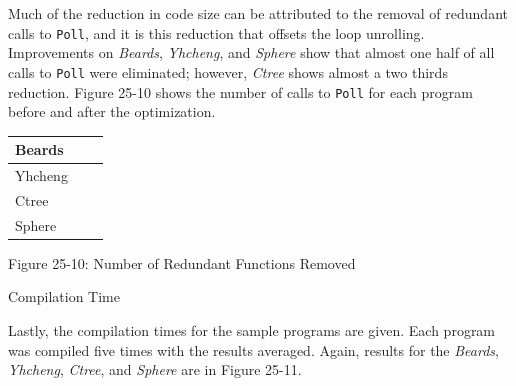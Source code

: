 Much of the reduction in code size can be attributed to the removal of
redundant calls to \texttt{Poll}, and it is this reduction that
offsets the loop unrolling. Improvements on \textit{Beards},
\textit{Yhcheng}, and \textit{Sphere} show that almost one half of all
calls to \texttt{Poll} were eliminated; however, \textit{Ctree} shows
almost a two thirds reduction. Figure 25-10 shows the number of calls
to \texttt{Poll} for each program before and after the optimization.

\begin{center}
\tabletail{}
\tablelasttail{}
\begin{xtabular}{|m{0.9406598in}|m{0.76435983in}|m{0.6712598in}|}
\hline
 Beards &
 &
\raggedleft{}\\\hline
 Yhcheng &
 &
\raggedleft{}\\\hline
 Ctree &
 &
\raggedleft{}\\\hline
 Sphere &
 &
\raggedleft{}\\\hline
\end{xtabular}
\end{center}
{\centering{}
Figure 25-10: Number of Redundant Functions Removed
\par}

{\sffamily
Compilation Time}

Lastly, the compilation times for the sample programs are given. Each
program was compiled five times with the results averaged. Again,
results for the \textit{Beards}, \textit{Yhcheng}, \textit{Ctree}, and
\textit{Sphere} are in Figure 25-11.

